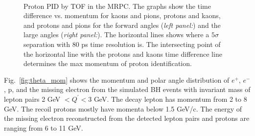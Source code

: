 \begin{figure}[t]
\begin{center}
\mbox{ \quad
{} }
\end{center}
\caption{\small{Proton PID by TOF in the MRPC. The graphs show the time
difference vs. momentum for kaons and pions, protons and kaons, and protons
and pions for the forward angles ({\it left panel:}) and the large angles
({\it right panel:}). The horizontal lines shows where a $5\sigma$ separation
with 80 ps time resolution is. The intersecting point of the horizontal line
with the protons and kaons time difference line determines the max momentum
of proton identification.}}
\label{fig:hid}
\end{figure}

Fig.~\ref{fig:theta_mom} shows the momentum and polar angle distribution
of $e^+$, $e^-$, p, and the missing electron from the simulated BH events
with invariant mass of lepton pairs 2 GeV $< Q^\prime < 3$ GeV. The decay
lepton has momentum from 2 to 8 GeV. The recoil protons mostly have momenta
below 1.5 GeV/c. The energy of the missing electron reconstructed from the
detected lepton pairs and protons are ranging from 6 to 11 GeV.

